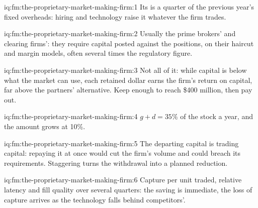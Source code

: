 \begin{solution}{iq:fm:the-proprietary-market-making-firm:1}
Its  is a quarter of the previous year's fixed overheads: hiring and technology raise it whatever the firm trades.
\end{solution}

\begin{solution}{iq:fm:the-proprietary-market-making-firm:2}
Usually the prime brokers' and clearing firms': they require capital posted against the positions, on their haircut and margin models, often
several times the regulatory figure.
\end{solution}

\begin{solution}{iq:fm:the-proprietary-market-making-firm:3}
Not all of it: while capital is below what the market can use, each retained dollar earns the firm's return on capital, far above the partners'
alternative. Keep enough to reach \$400 million, then pay out.
\end{solution}

\begin{solution}{iq:fm:the-proprietary-market-making-firm:4}
$g+d=35\%$ of the stock a year, and the amount grows at 10\%.
\end{solution}

\begin{solution}{iq:fm:the-proprietary-market-making-firm:5}
The departing capital is trading capital: repaying it at once would cut the firm's volume and could breach its requirements. Staggering turns the
withdrawal into a planned reduction.
\end{solution}

\begin{solution}{iq:fm:the-proprietary-market-making-firm:6}
Capture per unit traded, relative latency and fill quality over several quarters: the saving is immediate, the loss of capture arrives as the
technology falls behind competitors'.
\end{solution}
